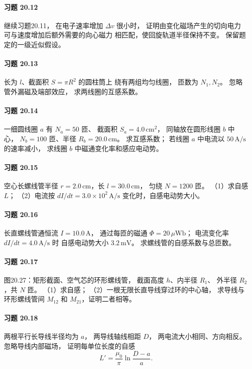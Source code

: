 \paragraph{习题 20.12}
继续习题20.11，
在电子速率增加 \(\Delta v\) 很小时，
证明由变化磁场产生的切向电力
可与速度增加后额外需要的向心磁力
相匹配，使回旋轨道半径保持不变。
保留题定的一级近似假设。

\paragraph{习题 20.13}
长为 \(l\)、截面积
\(S=\pi R^2\) 的圆柱筒上
绕有两组均匀线圈，
匝数为 \(N_1,N_2\)。
忽略管外漏磁及端部效应，
求两线圈的互感系数。

\paragraph{习题 20.14}
一细圆线圈 \(a\) 有
\(N_a=50\) 匝、
截面积 \(S_a=4.0\,\mathrm{cm^2}\)，
同轴放在圆形线圈 \(b\) 中心，
\(N_b=100\) 匝、半径
\(R_b=20.0\,\mathrm{cm}\)。
求互感系数；
若线圈 \(a\) 中电流以
\(50\,\mathrm{A/s}\) 的速率减小，
求线圈 \(b\) 中磁通变化率和感应电动势。

\paragraph{习题 20.15}
空心长螺线管半径
\(r=2.0\,\mathrm{cm}\)，长
\(l=30.0\,\mathrm{cm}\)，
匀绕 \(N=1200\) 匝。
（1）求自感 \(L\)；
（2）电流按
\(dI/dt=3.0\times10^2\,\mathrm{A/s}\)
变化时，自感电动势大小。

\paragraph{习题 20.16}
长直螺线管通恒流
\(I=10.0\,\mathrm A\)，
通过每匝的磁通
\(\Phi=20\,\mu\mathrm{Wb}\)；
电流变化率
\(dI/dt=4.0\,\mathrm{A/s}\) 时
自感电动势大小
\(3.2\,\mathrm{mV}\)。
求螺线管的自感系数与总匝数。

\paragraph{习题 20.17}
图20.27：矩形截面、空气芯的环形螺线管，
截面高度 \(h\)、内半径 \(R_1\)、
外半径 \(R_2\)，共 \(N\) 匝。
（1）求自感；
（2）一根无限长直导线穿过环的中心轴，
求导线与环形螺线管间
\(M_{12}\) 和 \(M_{21}\)，证明二者相等。

\paragraph{习题 20.18}
两根平行长导线半径均为 \(a\)，
两导线轴线相距 \(D\)，
两电流大小相同、方向相反。
忽略导线内部磁场，
证明每单位长度的自感
\[
 \boxed{L'=\frac{\mu_0}{\pi}
 \ln\frac{D-a}{a}}.
\]

